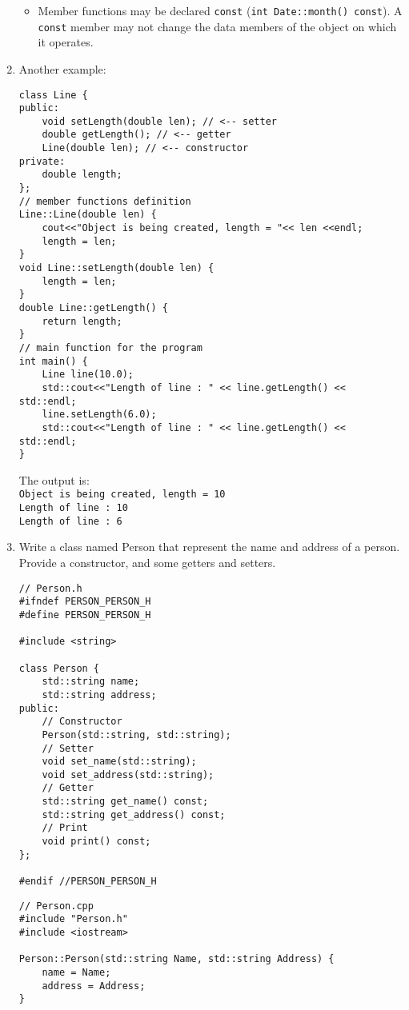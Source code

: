 \begin{enumerate}[$\triangleright$]
\begin{itemize}
        \item Member functions may be declared \texttt{const} (\lstinline|int Date::month() const|). A \texttt{const} member may not change the data members of the object on which it operates.
    \end{itemize}

    \item Another example:
    \begin{lstlisting}
class Line {
public:
    void setLength(double len); // <-- setter
    double getLength(); // <-- getter
    Line(double len); // <-- constructor
private:
    double length;
};
// member functions definition
Line::Line(double len) {
    cout<<"Object is being created, length = "<< len <<endl;
    length = len;
}
void Line::setLength(double len) {
    length = len;
}
double Line::getLength() {
    return length;
}
// main function for the program
int main() {
    Line line(10.0);
    std::cout<<"Length of line : " << line.getLength() << std::endl;
    line.setLength(6.0);
    std::cout<<"Length of line : " << line.getLength() << std::endl;
}
\end{lstlisting}

    The output is: \\
    \lstinline|Object is being created, length = 10| \\
    \lstinline|Length of line : 10| \\
    \lstinline|Length of line : 6|

    \newpage

    \item Write a class named Person that represent the name and address of a person. Provide a constructor, and some getters and setters.
    \begin{lstlisting}
// Person.h
#ifndef PERSON_PERSON_H
#define PERSON_PERSON_H

#include <string>

class Person {
    std::string name;
    std::string address;
public:
    // Constructor
    Person(std::string, std::string);
    // Setter
    void set_name(std::string);
    void set_address(std::string);
    // Getter
    std::string get_name() const;
    std::string get_address() const;
    // Print
    void print() const;
};

#endif //PERSON_PERSON_H
\end{lstlisting}
    \begin{lstlisting}
// Person.cpp
#include "Person.h"
#include <iostream>

Person::Person(std::string Name, std::string Address) {
    name = Name;
    address = Address;
}


\end{lstlisting}
\end{enumerate}
